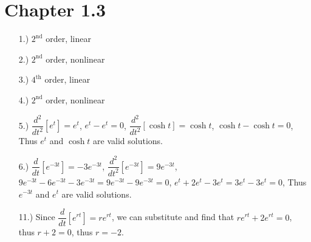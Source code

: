 \documentclass[12pt]{article}
\begin{document}
\section*{Chapter 1.3}
\begin{itemize}
    \item [1.)] $2^{\text{nd}}$ order, linear

    \item [2.)] $2^{\text{nd}}$ order, nonlinear

    \item [3.)] $4^{\text{th}}$ order, linear

    \item [4.)] $2^{\text{nd}}$ order, nonlinear

    \item [5.)] $\dfrac{d^2}{dt^2}\left[e^t\right]=e^t$, $e^t-e^t=0$,\newline
    $\dfrac{d^2}{dt^2}\left[\cosh t\right]=\cosh t$, $\cosh t-\cosh t=0$,\newline
    Thus $e^t$ and $\cosh t$ are valid solutions.

    \item [6.)] $\dfrac{d}{dt}\left[e^{-3t}\right]=-3e^{-3t}$, $\dfrac{d^2}{dt^2}\left[e^{-3t}\right]=9e^{-3t}$, $9e^{-3t}-6e^{-3t}-3e^{-3t}=9e^{-3t}-9e^{-3t}=0$,\newline
    $e^t+2e^t-3e^t=3e^t-3e^t=0$,\newline
    Thus $e^{-3t}$ and $e^t$ are valid solutions.

    \item [11.)] Since $\dfrac{d}{dt}\left[e^{rt}\right]=re^{rt}$, we can substitute and find that $re^{rt}+2e^{rt}=0$, thus $r+2=0$, thus $r=-2$.
\end{itemize}
\end{document}
